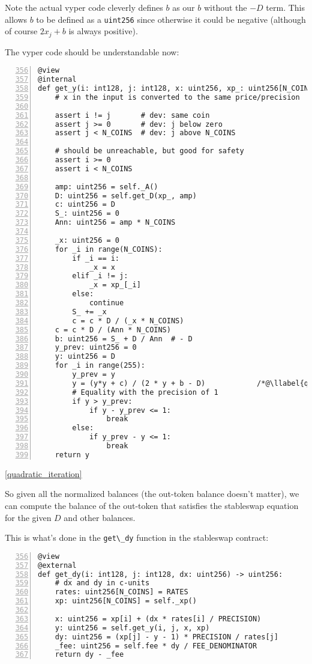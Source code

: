\documentclass[
]{article}
\makeatletter
\newcommand{\passthrough}[1]{#1}
\newcounter{llabel}[lstlisting]%
\renewcommand*{\thellabel}{%
    \ifnum\value{llabel}<0 %
      \@ctrerr
    \else
      \ifnum\value{llabel}>10 %
        \@ctrerr
      \else
        \protect\footnotesize\ding{\the\numexpr\value{llabel}+201\relax}%
      \fi
    \fi
  }%
\newlength{\llabelsep}
\newcommand*{\llabel}[1]{%
  \begingroup
    \refstepcounter{llabel}%
    \label{#1}%
    \llap{%
      \thellabel\kern\llabelsep
      \hphantom{\lst@numberstyle\the\lst@lineno}%
      \kern\lst@numbersep
    }%
  \endgroup
}
\makeatother
\begin{document}
Note the actual vyper code cleverly defines \(b\) as our \(b\) without
the \(-D\) term. This allows \(b\) to be defined as a
\passthrough{\lstinline!uint256!} since otherwise it could be negative
(although of course \(2x_j + b\) is always positive).

The vyper code should be understandable now:

\begin{lstlisting}[numbers=left, firstnumber=356, label=get_y]
@view
@internal
def get_y(i: int128, j: int128, x: uint256, xp_: uint256[N_COINS]) -> uint256:
    # x in the input is converted to the same price/precision

    assert i != j       # dev: same coin
    assert j >= 0       # dev: j below zero
    assert j < N_COINS  # dev: j above N_COINS

    # should be unreachable, but good for safety
    assert i >= 0
    assert i < N_COINS

    amp: uint256 = self._A()
    D: uint256 = self.get_D(xp_, amp)
    c: uint256 = D
    S_: uint256 = 0
    Ann: uint256 = amp * N_COINS

    _x: uint256 = 0
    for _i in range(N_COINS):
        if _i == i:
            _x = x
        elif _i != j:
            _x = xp_[_i]
        else:
            continue
        S_ += _x
        c = c * D / (_x * N_COINS)
    c = c * D / (Ann * N_COINS)
    b: uint256 = S_ + D / Ann  # - D
    y_prev: uint256 = 0
    y: uint256 = D
    for _i in range(255):
        y_prev = y
        y = (y*y + c) / (2 * y + b - D)            /*@\llabel{quadratic_iteration}@*/
        # Equality with the precision of 1
        if y > y_prev:
            if y - y_prev <= 1:
                break
        else:
            if y_prev - y <= 1:
                break
    return y
\end{lstlisting}

\ref{quadratic_iteration}

So given all the normalized balances (the out-token balance doesn't
matter), we can compute the balance of the out-token that satisfies the
stableswap equation for the given \(D\) and other balances.

This is what's done in the \passthrough{\lstinline!get\_dy!} function in
the stableswap contract:

\begin{lstlisting}[numbers=left, firstnumber=356, label=get_dy]
@view
@external
def get_dy(i: int128, j: int128, dx: uint256) -> uint256:
    # dx and dy in c-units
    rates: uint256[N_COINS] = RATES
    xp: uint256[N_COINS] = self._xp()

    x: uint256 = xp[i] + (dx * rates[i] / PRECISION)
    y: uint256 = self.get_y(i, j, x, xp)
    dy: uint256 = (xp[j] - y - 1) * PRECISION / rates[j]
    _fee: uint256 = self.fee * dy / FEE_DENOMINATOR
    return dy - _fee
\end{lstlisting}
\end{document}
